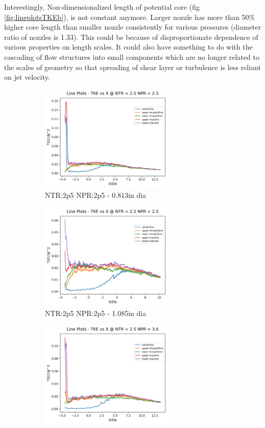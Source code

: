 Interestingly, Non-dimensionalized length of potential core (fig \ref{fig:lineplotsTKEb}), is not constant anymore. Larger nozzle has more than 50\% higher core length than smaller nozzle consistently for various pressures (diameter ratio of nozzles is 1.33). This could be because of disproportionate dependence of various properties on length scales. It could also have something to do with the cascading of flow structures into small components which are no longer related to the scales of geometry so that spreading of shear layer or turbulence is less reliant on jet velocity.

\begin{figure}[H]
\begin{subfigure}{.5\textwidth}
	\centering
	\includegraphics[width=2.5in]{images/LinePlots_TKE_NTR2p5_NPR2p5.png}
	\caption{NTR:2p5 NPR:2p5 - 0.813in dia }
	\label{fig:lineplotsTKEb2p52p5}
\end{subfigure}%
\begin{subfigure}{.5\textwidth}
	\centering
	\includegraphics[width=2.5in]{images/LinePlots_TKE_NTR2p5_NPR2p5b.png}
	\caption{NTR:2p5 NPR:2p5 - 1.085in dia }
	\label{fig:lineplotsTKEb2p52p5b}
\end{subfigure}
\begin{subfigure}{.5\textwidth}
	\centering
	\includegraphics[width=2.5in]{images/LinePlots_TKE_NTR2p5_NPR3p6.png}

\end{subfigure}
\end{figure}
